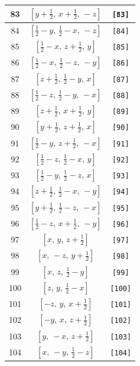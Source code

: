 \documentclass[fleqn,8pt]{jsarticle}
\begin{document}
\begin{longtable}{ccc}
83 & $\left[ y + \frac{1}{2},\, x + \frac{1}{2},\, - z \right]$ & {\tt [83]} \\ \hline
84 & $\left[ \frac{1}{2} - y,\, \frac{1}{2} - x,\, - z \right]$ & {\tt [84]} \\ \hline
85 & $\left[ \frac{1}{2} - x,\, z + \frac{1}{2},\, y \right]$ & {\tt [85]} \\ \hline
86 & $\left[ \frac{1}{2} - x,\, \frac{1}{2} - z,\, - y \right]$ & {\tt [86]} \\ \hline
87 & $\left[ z + \frac{1}{2},\, \frac{1}{2} - y,\, x \right]$ & {\tt [87]} \\ \hline
88 & $\left[ \frac{1}{2} - z,\, \frac{1}{2} - y,\, - x \right]$ & {\tt [88]} \\ \hline
89 & $\left[ z + \frac{1}{2},\, x + \frac{1}{2},\, y \right]$ & {\tt [89]} \\ \hline
90 & $\left[ y + \frac{1}{2},\, z + \frac{1}{2},\, x \right]$ & {\tt [90]} \\ \hline
91 & $\left[ \frac{1}{2} - y,\, z + \frac{1}{2},\, - x \right]$ & {\tt [91]} \\ \hline
92 & $\left[ \frac{1}{2} - z,\, \frac{1}{2} - x,\, y \right]$ & {\tt [92]} \\ \hline
93 & $\left[ \frac{1}{2} - y,\, \frac{1}{2} - z,\, x \right]$ & {\tt [93]} \\ \hline
94 & $\left[ z + \frac{1}{2},\, \frac{1}{2} - x,\, - y \right]$ & {\tt [94]} \\ \hline
95 & $\left[ y + \frac{1}{2},\, \frac{1}{2} - z,\, - x \right]$ & {\tt [95]} \\ \hline
96 & $\left[ \frac{1}{2} - z,\, x + \frac{1}{2},\, - y \right]$ & {\tt [96]} \\ \hline
97 & $\left[ x,\, y,\, z + \frac{1}{2} \right]$ & {\tt [97]} \\ \hline
98 & $\left[ x,\, - z,\, y + \frac{1}{2} \right]$ & {\tt [98]} \\ \hline
99 & $\left[ x,\, z,\, \frac{1}{2} - y \right]$ & {\tt [99]} \\ \hline
100 & $\left[ z,\, y,\, \frac{1}{2} - x \right]$ & {\tt [100]} \\ \hline
101 & $\left[ - z,\, y,\, x + \frac{1}{2} \right]$ & {\tt [101]} \\ \hline
102 & $\left[ - y,\, x,\, z + \frac{1}{2} \right]$ & {\tt [102]} \\ \hline
103 & $\left[ y,\, - x,\, z + \frac{1}{2} \right]$ & {\tt [103]} \\ \hline
104 & $\left[ x,\, - y,\, \frac{1}{2} - z \right]$ & {\tt [104]} \\ \hline

\end{longtable}
\end{document}

